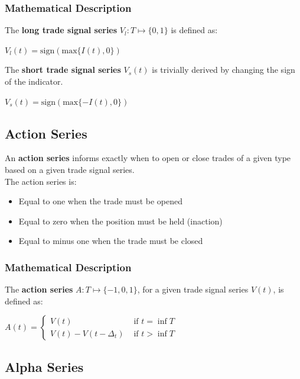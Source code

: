 \documentclass[11pt]{article}
\begin{document}
\subsubsection{Mathematical Description}

The \textbf{long trade signal series} $V_l:T \mapsto \{ 0,1 \}$ is defined as:
\begin{center}
    $V_l(t) = \text{sign}(\text{max}\{I(t),0 \})$
\end{center}

The \textbf{short trade signal series} $V_s(t)$ is trivially derived by changing the sign of the indicator.
\begin{center}
    $V_s(t) = \text{sign}(\text{max}\{-I(t),0 \})$
\end{center}

\subsection{Action Series}

An \textbf{action series} informs exactly when to open or close trades of a given type based on a given trade signal series.\\

The action series is:
\begin{itemize}
    \item Equal to one when the trade must be opened
    \item Equal to zero when the position must be held (inaction)
    \item Equal to minus one when the trade must be closed
\end{itemize}

\subsubsection{Mathematical Description}

The \textbf{action series} $A:T \mapsto \{ -1,0,1 \}$, for a given trade signal series $V(t)$, is defined as:
\begin{center}
    $A(t) = \begin{cases}
V(t) & \text{ if } t= \inf{T}\\ 
V(t) - V(t - \Delta_t) & \text{ if }  t > \inf{T}
\end{cases}$
\end{center}



\subsection{Alpha Series}
\end{document}
